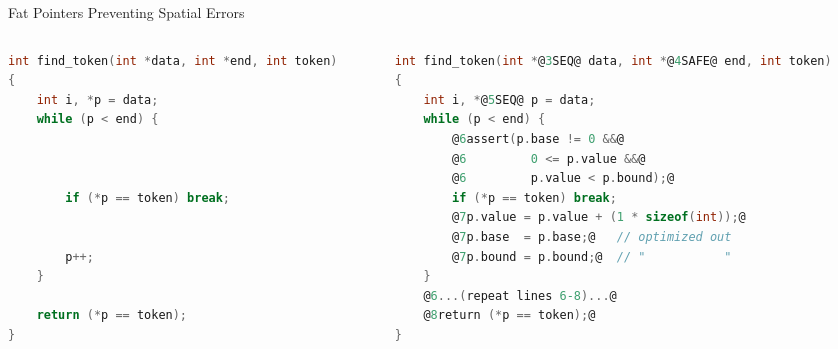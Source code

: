 \documentclass[aspectratio=169]{beamer}
\begin{document}
\begin{frame}[fragile]{Fat Pointers Preventing Spatial Errors}
    \begin{columns}[T]
      \begin{column}{0.44\textwidth}
\begin{lstlisting}[language=C,mathescape,basicstyle={\tiny\ttfamily}]
int find_token(int *data, int *end, int token)
{
    int i, *p = data;
    while (p < end) {



        if (*p == token) break;


        p++;
    }

    return (*p == token);
}
\end{lstlisting}
\end{column}

\pause

\begin{column}{0.56\textwidth}

\begin{lstlisting}[language=C,mathescape,basicstyle={\tiny\ttfamily},
    moredelim={**[is][\btHL<3>]{@3}{@}},
    moredelim={**[is][{\btHL<4>}]{@4}{@}},
    moredelim={**[is][{\btHL<5>}]{@5}{@}},
    moredelim={**[is][{\btHL<6>}]{@6}{@}},
    moredelim={**[is][{\btHL<7>}]{@7}{@}},
    moredelim={**[is][{\btHL<8>}]{@8}{@}}
]
int find_token(int *@3SEQ@ data, int *@4SAFE@ end, int token)
{
    int i, *@5SEQ@ p = data;
    while (p < end) {
        @6assert(p.base != 0 &&@
        @6         0 <= p.value &&@
        @6         p.value < p.bound);@
        if (*p == token) break;
        @7p.value = p.value + (1 * sizeof(int));@
        @7p.base  = p.base;@   // optimized out
        @7p.bound = p.bound;@  // "           "
    }
    @6...(repeat lines 6-8)...@
    @8return (*p == token);@
}
\end{lstlisting}
\end{column}

\end{columns}
\end{frame}
\end{document}
